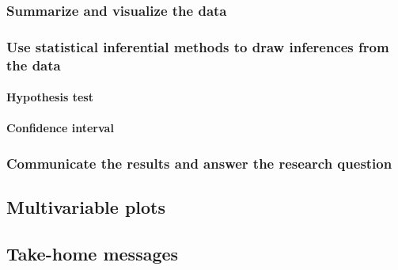 \documentclass[
]{report}
\begin{document}
\hypertarget{summarize-and-visualize-the-data-6}{%
\subsubsection*{Summarize and visualize the data}\label{summarize-and-visualize-the-data-6}}

\hypertarget{use-statistical-inferential-methods-to-draw-inferences-from-the-data-6}{%
\subsubsection*{Use statistical inferential methods to draw inferences from the data}\label{use-statistical-inferential-methods-to-draw-inferences-from-the-data-6}}

\hypertarget{hypothesis-test-3}{%
\paragraph*{Hypothesis test}\label{hypothesis-test-3}}

\hypertarget{confidence-interval-10}{%
\paragraph*{Confidence interval}\label{confidence-interval-10}}

\hypertarget{communicate-the-results-and-answer-the-research-question-5}{%
\subsubsection*{Communicate the results and answer the research question}\label{communicate-the-results-and-answer-the-research-question-5}}

\hypertarget{multivariable-plots-2}{%
\subsection*{Multivariable plots}\label{multivariable-plots-2}}

\hypertarget{take-home-messages-21}{%
\subsection{Take-home messages}\label{take-home-messages-21}}
\end{document}
